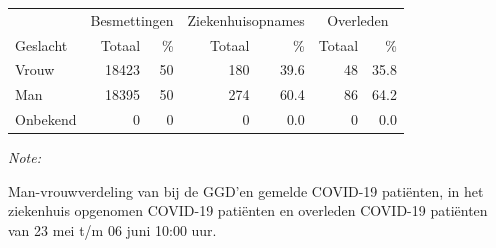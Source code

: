\documentclass[
  english,
  man,floatsintext]{apa6}
\begin{document}
\begin{table}
\centering\begingroup\fontsize{11}{13}\selectfont

\begin{threeparttable}
\begin{tabular}{lrrrrrr}
\toprule
\multicolumn{1}{c}{ } & \multicolumn{2}{c}{Besmettingen} & \multicolumn{2}{c}{Ziekenhuisopnames} & \multicolumn{2}{c}{Overleden} \\
\cmidrule(l{3pt}r{3pt}){2-3} \cmidrule(l{3pt}r{3pt}){4-5} \cmidrule(l{3pt}r{3pt}){6-7}
Geslacht & Totaal & \% & Totaal & \% & Totaal & \%\\
\midrule
Vrouw & 18423 & 50 & 180 & 39.6 & 48 & 35.8\\
Man & 18395 & 50 & 274 & 60.4 & 86 & 64.2\\
Onbekend & 0 & 0 & 0 & 0.0 & 0 & 0.0\\
\bottomrule
\end{tabular}
\begin{tablenotes}
\item \textit{Note: } 
\item Man-vrouwverdeling van bij de GGD’en gemelde COVID-19 patiënten, in het ziekenhuis opgenomen COVID-19 patiënten en overleden COVID-19 patiënten van 23 mei t/m 06 juni 10:00 uur.
\end{tablenotes}
\end{threeparttable}
\endgroup{}
\end{table}
\newpage
\end{document}
